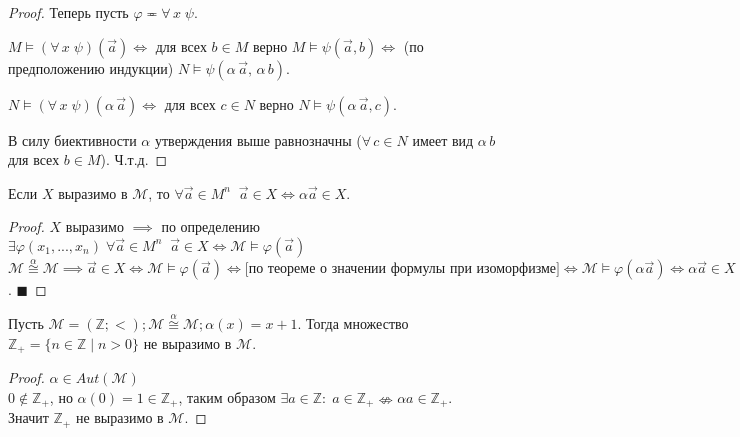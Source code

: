 \documentclass[a4paper, fleqn]{article}
\begin{document}
\begin{proof}
    Теперь пусть $\varphi \eqcirc \forall \, x \; \psi.$
    
    $M \vDash (\forall \, x \; \psi ) (\overset{\to}{a}) \iff $ для всех $b \in M$ верно $ M \vDash \psi (\overset{\to}{a}, b) \iff$ (по предположению индукции) $N \vDash \psi (\alpha \, \overset{\to}{a}, \, \alpha \, b).$
    
    $N \vDash (\forall \, x \; \psi ) (\alpha \, \overset{\to}{a}) \iff $ для всех $c \in N$ верно $ N \vDash \psi (\alpha \, \overset{\to}{a}, c).$
    
    В силу биективности $\alpha$ утверждения выше равнозначны ($\forall \, c \in N $ имеет вид $ \alpha \, b$ для всех $b \in M$). Ч.т.д.
    
    \end{proof}

    \begin{theorem}
        Если $X$ выразимо в $\mathcal{M}$, то $\forall \overrightarrow{a} \in M^n \; \; \overrightarrow{a} \in X \Leftrightarrow \alpha \overrightarrow{a} \in X$.
    \end{theorem}

    \begin{proof}
        $X$ выразимо $\implies$ по определению $\exists \varphi(x_1, ..., x_n) \; \forall \overrightarrow{a} \in M^n \; \; \overrightarrow{a} \in X \Leftrightarrow \mathcal{M} \vDash \varphi(\overrightarrow{a})$ \\
        $\mathcal{M} \stackrel{\alpha}{\cong} \mathcal{M} \implies \overrightarrow{a} \in X \Leftrightarrow \mathcal{M} \vDash \varphi(\overrightarrow{a}) \Leftrightarrow \text{[по теореме о значении формулы при изоморфизме]} \Leftrightarrow \mathcal{M} \vDash \varphi(\alpha \overrightarrow{a}) \Leftrightarrow \alpha \overrightarrow{a} \in X$. $\blacksquare$
    \end{proof}

    \begin{proposition}
        Пусть $\mathcal{M} = (\mathbb{Z}; <); \mathcal{M} \stackrel{\alpha}{\cong} \mathcal{M}; \alpha(x) = x + 1$. Тогда множество $\mathbb{Z}_+ = \{ n \in \mathbb{Z} \mid n > 0 \}$ не выразимо в $\mathcal{M}$.
    \end{proposition}

    \begin{proof}
        $\alpha \in Aut(\mathcal{M})$ \\
        $0 \notin \mathbb{Z}_+$, но $\alpha(0) = 1 \in \mathbb{Z}_+$, таким образом $\exists a \in \mathbb{Z}: \; a \in \mathbb{Z}_+ \nLeftrightarrow \alpha a \in \mathbb{Z}_+$. \\
        Значит $\mathbb{Z}_+$ не выразимо в $\mathcal{M}$.
    \end{proof}
\end{document}
